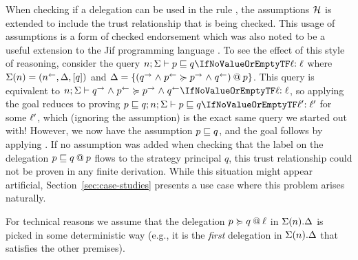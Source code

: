 When checking if a delegation can be used in the rule , the assumptions $\Assumps$ is extended to include the trust relationship that is being checked. This usage of assumptions is a form of checked endorsement which was also noted to be a useful extension to the Jif programming language \cite{Chong:2007:SWA:1294261.1294265}.
To see the effect of this style of reasoning, consider the query $\flowstoquery{n; \env}{p}{q}{\level}$ where $\env(n) = (\integ{n}, \scope, \lbrack q \rbrack)$ and $\scope = \{\lb{p}{(\conf{q} \conj \integ{p} \actsfor \conf{p} \conj \integ{q})} \}$. This query is equivalent to $\actsforquery{n; \env}{\conf{q} \conj \integ{p}}{\conf{p} \conj \integ{q}}{\level}$, so applying  the goal reduces to proving $\flowstoquery{p \flowsto q; n; \env}{p}{q}{\level'}$ for some $\level'$, which (ignoring the assumption) is the exact same query we started out with! However, we now have the assumption $p \flowsto q$, and the goal follows by applying . If no assumption was added when checking that the label on the delegation $\lb{p}{p \flowsto q}$ flows to the strategy principal $q$, this trust relationship could not be proven in any finite derivation. While this situation might appear artificial, Section~\ref{sec:case-studies} presents a use case where this problem arises naturally.

For technical reasons we assume that the delegation $\lb{\level}{p \actsfor q}$ in $\env(n).\scope$ is picked in some deterministic way (e.g., it is the \emph{first} delegation in $\env(n).\scope$ that satisfies the other premises).


